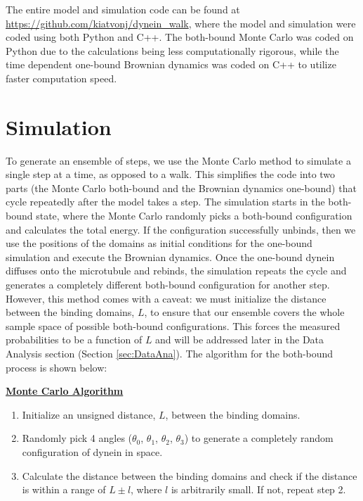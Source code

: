 
The entire model and simulation code can be found at \url{https://github.com/kiatvonj/dynein_walk}, where the model and simulation were coded using both Python and C++. The both-bound Monte Carlo was coded on Python due to the calculations being less computationally rigorous, while the time dependent one-bound Brownian dynamics was coded on C++ to utilize faster computation speed.

\section{Simulation}
To generate an ensemble of steps, we use the Monte Carlo method to simulate a single step at a time, as opposed to a walk. This simplifies the code into two parts (the Monte Carlo both-bound and the Brownian dynamics one-bound) that cycle repeatedly after the model takes a step. The simulation starts in the both-bound state, where the Monte Carlo randomly picks a both-bound configuration and calculates the total energy. If the configuration successfully unbinds, then we use the positions of the domains as initial conditions for the one-bound simulation and execute the Brownian dynamics. Once the one-bound dynein diffuses onto the microtubule and rebinds, the simulation repeats the cycle and generates a completely different both-bound configuration for another step. However, this method comes with a caveat: we must initialize the distance between the binding domains, $L$, to ensure that our ensemble covers the whole sample space of possible both-bound configurations. This forces the measured probabilities to be a function of $L$ and will be addressed later in the Data Analysis section (Section \ref{sec:DataAna}). The algorithm for the both-bound process is shown below:

\newpage
\begin{center}\label{alg:MonteCarlo}
	\textbf{\underline{Monte Carlo Algorithm}}
\end{center}


\begin{enumerate}
	\item Initialize an unsigned distance, $L$, between the binding domains.
	
	\item Randomly pick 4 angles ($\theta_0$, $\theta_1$, $\theta_2$, $\theta_3$) to generate a completely random configuration of dynein in space.
	
	\item Calculate the distance between the binding domains and check if the distance is within a range of $L\pm l$, where $l$ is arbitrarily small. If not, repeat step 2.
\end{enumerate}


